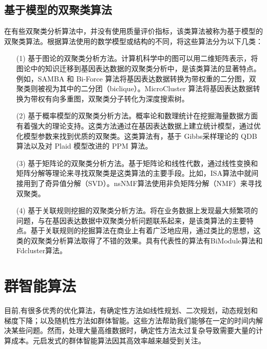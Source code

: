   \subsection{基于模型的双聚类算法}
  在有些双聚类分析算法中，并没有使用质量评价指标，该类算法被称为基于模型的双聚类算法。根据算法使用的数学模型或结构的不同，将这些算法分为以下几类：
  \begin{enumerate}
    \item[(1)]基于图论的双聚类分析方法。计算机科学中的图可以用二维矩阵表示，将图论中的知识迁移到基因表达数据的双聚类分析中，是该类算法的显著特点。例如，SAMBA 和 Bi-Force 算法将基因表达数据转换为带权重的二分图，双聚类则被视为其中的二分团（biclique）。MicroCluster 算法将基因表达数据转换为带权有向多重图，双聚类分子转化为深度搜索树。

    \item[(2)]基于概率模型的双聚类分析方法。概率论和数理统计在挖掘海量数据方面有着强大的理论支持。这类方法通过在基因表达数据上建立统计模型，通过优化模型参数来找到优质的双聚类。这类算法有，基于 Gibbs采样理论的 QDB 算法以及对 Plaid 模型改进的 PPM 算法。
    
    \item[(3)]基于矩阵论的双聚类分析方法。基于矩阵论和线性代数，通过线性变换和矩阵分解等理论来寻找双聚类是这类算法的主要手段。比如，ISA算法中就间接用到了奇异值分解（SVD）。nsNMF算法使用非负矩阵分解（NMF）来寻找双聚类。
    
    \item[(4)]基于关联规则挖掘的双聚类分析方法。将在业务数据上发现最大频繁项的问题，与在基因表达数据中双聚类分析问题联系起来，是该类算法的主要特点。基于关联规则的挖掘算法在商业上有着广泛地应用，通过类比的思想，这类的双聚类分析算法取得了不错的效果。具有代表性的算法有BiModule算法和Fdcluster算法。
    
  \end{enumerate}

\section{群智能算法}
目前,有很多优秀的优化算法，有确定性方法如线性规划、二次规划，动态规划和梯度下降；以及随机性方法如群体智能。这些方法帮助我们能够在一定的时间内解决某些问题。然而，处理大量高维数据时，确定性方法太过复杂导致需要大量的计算成本。元启发式的群体智能算法因其高效率越来越受到关注。


